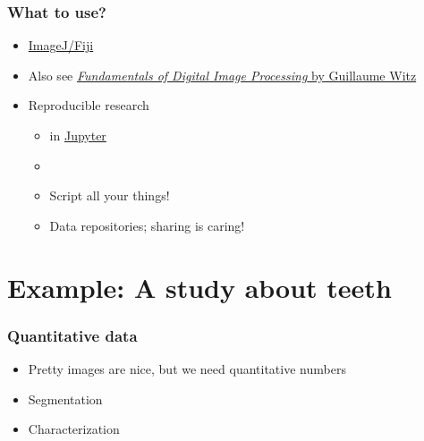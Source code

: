 \begin{frame}
	\frametitle{What to use?}
	\begin{itemize}
		\item \href{http://fiji.sc/}{ImageJ/Fiji}~\cite{Schindelin2012}
		\item Also see \href{https://ilias.unibe.ch/goto_ilias3_unibe_sess_2774485.html}{\emph{Fundamentals of Digital Image Processing} by Guillaume Witz}
		\item Reproducible research
		\begin{itemize}
			\item \href{https://www.python.org/}{\faPython} in \href{https://jupyter.org/}{Jupyter}~\cite{Kluyver2016}
			\item \href{https://git-scm.com/}{\faGit}
			\item Script all your things!
			\item Data repositories; \ie{} sharing is caring!
		\end{itemize}
	\end{itemize}
\end{frame}

\section{Example: A study about teeth}
\begin{frame}
	\frametitle{Quantitative data}
	\begin{itemize}
		\item Pretty images are nice, but we need quantitative numbers
		\item Segmentation
		\item Characterization
	\end{itemize}
\end{frame}

